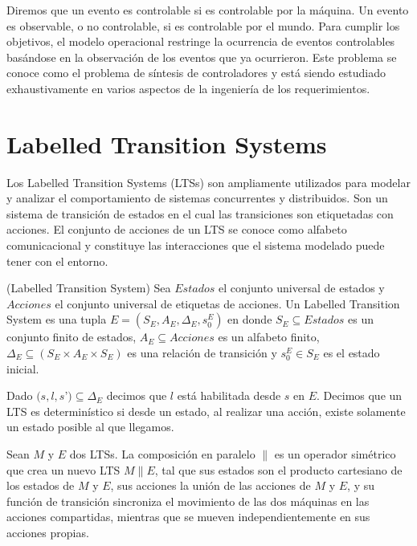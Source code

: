 Diremos que un evento es controlable si es controlable por la máquina. Un evento es observable, o no controlable, si es 
controlable por el mundo. 
Para cumplir los objetivos, el modelo operacional restringe la ocurrencia de eventos controlables basándose en la observación 
de los eventos que ya ocurrieron. 
Este problema se conoce como el problema de síntesis de controladores y está siendo estudiado exhaustivamente en varios 
aspectos de la ingeniería de los requerimientos.

\section{Labelled Transition Systems}
\label{sec:LTS}

Los Labelled Transition Systems \cite{LTS} (LTSs) son ampliamente utilizados para modelar y analizar el comportamiento de 
sistemas concurrentes y distribuidos. Son un sistema de transición de estados en el cual las transiciones son etiquetadas 
con acciones. El conjunto de acciones de un LTS se conoce como alfabeto comunicacional y constituye las interacciones que 
el sistema modelado puede tener con el entorno.

\begin{definition}{(Labelled Transition System)}
Sea $Estados$ el conjunto universal de estados y $Acciones$ el conjunto universal de etiquetas de acciones. Un Labelled 
Transition System es una tupla $E = (S_{E}, A_{E}, \Delta_{E}, s_{0}^{E})$ en donde $S_{E} \subseteq Estados$ es un conjunto 
finito de estados, $A_{E} \subseteq Acciones$ es un alfabeto finito, $\Delta_{E} \subseteq (S_{E} \times A_{E} \times S_{E})$ es una 
relación de transición y $s_{0}^{E} \in S_{E}$ es el estado inicial.
\end{definition}

Dado $(s, l, s$’$) \subseteq \Delta_{E}$ decimos que $l$ está habilitada desde $s$ en $E$. Decimos que un LTS es 
determinístico si desde un estado, al realizar una acción, existe solamente un estado posible al que llegamos.

Sean $M$ y $E$ dos LTSs. La composición en paralelo $\parallel$ es un operador 
simétrico que crea un nuevo LTS $M \parallel E$, 
tal que sus estados son el producto cartesiano de los estados de $M$ y $E$, sus acciones la unión de las acciones de $M$ y $E$, 
y su función de transición sincroniza el movimiento de las dos máquinas en las acciones compartidas, mientras que se 
mueven independientemente en sus acciones propias.

